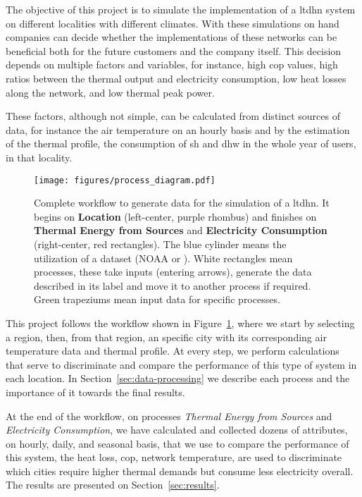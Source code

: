 \documentclass{article}
\begin{document}
The objective of this project is to simulate the implementation of a \gls{ltdhn} system on different localities with different climates. With these simulations on hand companies can decide whether the implementations of these networks can be beneficial both for the future customers and the company itself. This decision depends on multiple factors and variables, for instance, high \gls{cop} values, \idest high ratios between the thermal output and electricity consumption, low heat losses along the network, and low thermal peak power.

These factors, although not simple, can be calculated from distinct sources of data, for instance the air temperature on an hourly basis and by the estimation of the thermal profile, \idest the consumption of \gls{sh} and \gls{dhw} in the whole year of users, in that locality. 

\begin{figure}[ht]
\centering
\texttt{[image: figures/process\_diagram.pdf]}
\caption{Complete workflow to generate data for the simulation of a \gls{ltdhn}. It begins on \textbf{Location} (left-center, purple rhombus) and finishes on \textbf{Thermal Energy from Sources} and \textbf{Electricity Consumption} (right-center, red rectangles). The blue cylinder means the utilization of a dataset (NOAA or \inspire). White rectangles mean processes, these take inputs (entering arrows), generate the data described in its label and move it to another process if required. Green trapeziums mean input data for specific processes.}
\label{fig:project_workflow}
\end{figure}

This project follows the workflow shown in Figure~\ref{fig:project_workflow}, where we start by selecting a region, then, from that region, an specific city with its corresponding air temperature data and thermal profile. At every step, we perform calculations that serve to discriminate and compare the performance of this type of system in each location. In Section~\ref{sec:data-processing} we describe each process and the importance of it towards the final results.

At the end of the workflow, on processes \emph{Thermal Energy from Sources } and \emph{Electricity Consumption}, we have calculated and collected dozens of attributes, on hourly, daily, and seasonal basis, that we use to compare the performance of this system, \eg the heat loss, \gls{cop}, network temperature, are used to discriminate which cities require higher thermal demands but consume less electricity overall. The results are presented on Section~\ref{sec:results}.
\end{document}
